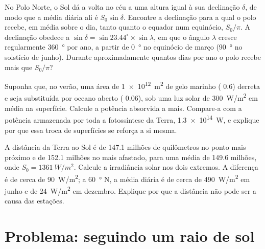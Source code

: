 \begin{exercise}[$\star\star\star$]\label{exo:g10:earth-energy-budget:13}
No Polo Norte, o Sol dá a volta no céu a uma altura igual à sua declinação
$\delta$, de modo que a  média diária ali é $S_0 \sin
\delta$.
Encontre a declinação para a qual o polo recebe, em média sobre o dia,
tanto quanto o equador num equinócio, $S_0/\pi$. A declinação obedece a
$\sin\delta = \sin 23.44^\circ \times \sin\lambda$, em que o ângulo
$\lambda$ cresce regularmente \qty{360}{\degree} por ano, a partir de
\qty{0}{\degree} no equinócio de março (\qty{90}{\degree} no solstício de
junho). Durante aproximadamente quantos dias por ano o polo recebe mais que
$S_0/\pi$?
\end{exercise}

\begin{exercise}[$\star\star\star$]\label{exo:g10:earth-energy-budget:14}
Suponha que, no verão, uma área de \qty{1e12}{m^2} de gelo marinho (
0.6) derreta e seja substituída por oceano aberto ( 0.06), sob uma luz
solar de \qty{300}{W/m^2} em média na superfície. Calcule a potência
absorvida a mais. Compare-a com a potência armazenada por toda a
fotossíntese da Terra, \qty{1.3e14}{W}, e explique por que essa troca de
superfícies se reforça a si mesma.
\end{exercise}

\begin{exercise}[$\star\star\star$]\label{exo:g10:earth-energy-budget:15}
A distância da Terra ao Sol é de \num{147.1} milhões de quilômetros no
ponto mais próximo e de \num{152.1} milhões no mais afastado, para uma média
de \num{149.6} milhões, onde $S_0 = \qty{1361}{W/m^2}$. Calcule a
irradiância solar nos dois extremos. A diferença é de cerca de
\qty{90}{W/m^2}; a \qty{60}{\degree} N, a  média diária é de cerca
de \qty{490}{W/m^2} em junho e de \qty{24}{W/m^2} em dezembro. Explique por
que a distância não pode ser a causa das estações.
\end{exercise}

\section{Problema: seguindo um raio de sol}

